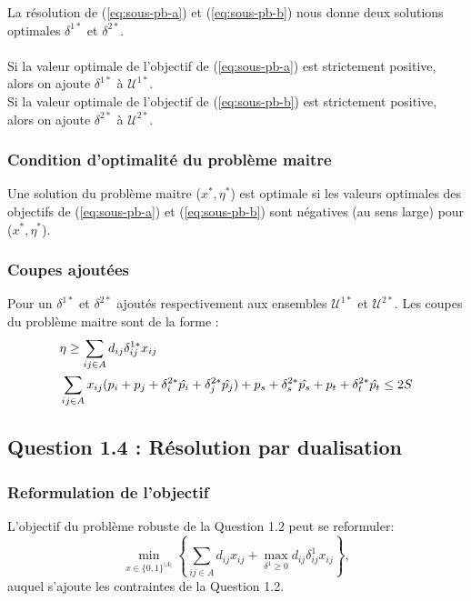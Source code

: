 \documentclass{article}
\begin{document}
La résolution de (\ref{eq:sous-pb-a}) et (\ref{eq:sous-pb-b}) nous donne deux solutions optimales $\delta^{1*}$ et $\delta^{2*}$. \\
\\
Si la valeur optimale de l'objectif de (\ref{eq:sous-pb-a}) est strictement positive, alors on ajoute $\delta^{1*}$ à $\mathcal{U}^{1*}$. \\
Si la valeur optimale de l'objectif de (\ref{eq:sous-pb-b}) est strictement positive, alors on ajoute $\delta^{2*}$ à $\mathcal{U}^{2*}$.

\subsubsection{Condition d'optimalité du problème maitre}
Une solution du problème maitre ($x^*, \eta^*$) est optimale si les valeurs optimales des objectifs de (\ref{eq:sous-pb-a}) et (\ref{eq:sous-pb-b}) sont négatives (au sens large) pour ($x^*, \eta^*$).

\subsubsection{Coupes ajoutées}

Pour un  $\delta^{1*}$ et $\delta^{2*}$ ajoutés respectivement aux ensembles $\mathcal{U}^{1*}$ et $\mathcal{U}^{2*}$. Les coupes du problème maitre sont de la forme : 
\begin{align}
  & \eta \geq \sum_{ij \in A} d_{ij} \delta_{ij}^{1*} x_{ij} \notag \\
  & \sum_{ij \in A} x_{ij}(p_i + p_j + \delta_{i}^{2*} \hat{p_i} + \delta_{j}^{2*} \hat{p_j}) + p_s + \delta_{s}^{2*} \hat{p_s} + p_t + \delta_{t}^{2*} \hat{p_t} \leq 2S \notag
\end{align}


\subsection{Question 1.4 : Résolution par dualisation}

\subsubsection{Reformulation de l'objectif}

L'objectif du problème robuste de la Question 1.2 peut se reformuler:
$$ \min_{x \in \{0,1\}^{|A|}} \left\{ \sum_{ij \in A} d_{ij} x_{ij} + \max_{\delta^{1} \geq 0} d_{ij} \delta_{ij}^{1} x_{ij} \right\},$$
auquel s'ajoute les contraintes de la Question 1.2.
\end{document}
